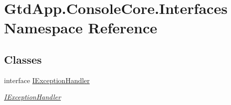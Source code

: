 \hypertarget{namespace_gtd_app_1_1_console_core_1_1_interfaces}{}\section{Gtd\+App.\+Console\+Core.\+Interfaces Namespace Reference}
\label{namespace_gtd_app_1_1_console_core_1_1_interfaces}
\subsection*{Classes}
\begin{DoxyCompactItemize}
\item 
interface \mbox{\hyperlink{interface_gtd_app_1_1_console_core_1_1_interfaces_1_1_i_exception_handler}{I\+Exception\+Handler}}
\begin{DoxyCompactList}\small\item\em \mbox{\hyperlink{interface_gtd_app_1_1_console_core_1_1_interfaces_1_1_i_exception_handler}{I\+Exception\+Handler}} \end{DoxyCompactList}\end{DoxyCompactItemize}
